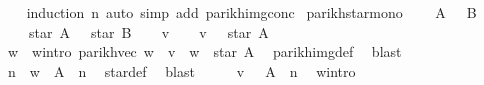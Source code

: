\begin{isabellebody}
%
\isadelimproof
\ \ %
\endisadelimproof
%
\isatagproof
{}\isamarkupfalse%
\ {\isacharparenleft}{\kern0pt}induction\ n{\isacharparenright}{\kern0pt}\ {\isacharparenleft}{\kern0pt}auto\ simp\ add{\isacharcolon}{\kern0pt}\ parikh{\isacharunderscore}{\kern0pt}img{\isacharunderscore}{\kern0pt}conc{\isacharparenright}{\kern0pt}%
\endisatagproof
{\isafoldproof}%
%
\isadelimproof
\isanewline
%
\endisadelimproof
\isanewline
\isanewline
{}\isamarkupfalse%
\ parikh{\isacharunderscore}{\kern0pt}star{\isacharunderscore}{\kern0pt}mono{\isacharcolon}{\kern0pt}\isanewline
\ \ \ {\isachardoublequoteopen}{\isasymPsi}\ A\ {\isasymsubseteq}\ {\isasymPsi}\ B{\isachardoublequoteclose}\isanewline
\ \ \ {\isachardoublequoteopen}{\isasymPsi}\ {\isacharparenleft}{\kern0pt}star\ A{\isacharparenright}{\kern0pt}\ {\isasymsubseteq}\ {\isasymPsi}\ {\isacharparenleft}{\kern0pt}star\ B{\isacharparenright}{\kern0pt}{\isachardoublequoteclose}\isanewline
%
\isadelimproof
%
\endisadelimproof
%
\isatagproof
{}\isamarkupfalse%
\isanewline
\ \ \isamarkupfalse%
\ v\isanewline
\ \ \isamarkupfalse%
\ {\isachardoublequoteopen}v\ {\isasymin}\ {\isasymPsi}\ {\isacharparenleft}{\kern0pt}star\ A{\isacharparenright}{\kern0pt}{\isachardoublequoteclose}\isanewline
\ \ \isamarkupfalse%
\ \isamarkupfalse%
\ w\ \ w{\isacharunderscore}{\kern0pt}intro{\isacharcolon}{\kern0pt}\ {\isachardoublequoteopen}parikh{\isacharunderscore}{\kern0pt}vec\ w\ {\isacharequal}{\kern0pt}\ v\ {\isasymand}\ w\ {\isasymin}\ star\ A{\isachardoublequoteclose}\ \isamarkupfalse%
\ parikh{\isacharunderscore}{\kern0pt}img{\isacharunderscore}{\kern0pt}def\ \isamarkupfalse%
\ blast\isanewline
\ \ \isamarkupfalse%
\ \isamarkupfalse%
\ n\ \ {\isachardoublequoteopen}w\ {\isasymin}\ A\ {\isacharcircum}{\kern0pt}{\isacharcircum}{\kern0pt}\ n{\isachardoublequoteclose}\ \isamarkupfalse%
\ star{\isacharunderscore}{\kern0pt}def\ \isamarkupfalse%
\ blast\isanewline
\ \ \isamarkupfalse%
\ \isamarkupfalse%
\ {\isachardoublequoteopen}v\ {\isasymin}\ {\isasymPsi}\ {\isacharparenleft}{\kern0pt}A\ {\isacharcircum}{\kern0pt}{\isacharcircum}{\kern0pt}\ n{\isacharparenright}{\kern0pt}{\isachardoublequoteclose}\ \isamarkupfalse%
\ w{\isacharunderscore}{\kern0pt}intro\ \isamarkupfalse%

\end{isabellebody}
